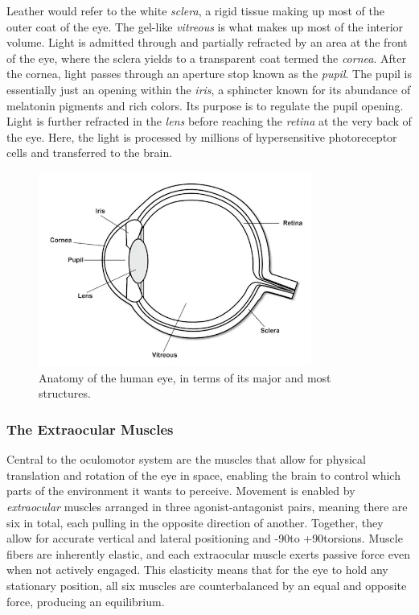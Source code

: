 Leather would refer to the white \textit{sclera}, a rigid tissue making up most of the outer coat of the eye. The gel-like \textit{vitreous} is what makes up most of the interior volume. Light is admitted through and partially refracted by an area at the front of the eye, where the sclera yields to a transparent coat termed the \textit{cornea}. After the cornea, light passes through an aperture stop known as the \textit{pupil}. The pupil is essentially just an opening within the \textit{iris}, a sphincter known for its abundance of melatonin pigments and rich colors. Its purpose is to regulate the pupil opening. Light is further refracted in the \textit{lens} before reaching the \textit{retina} at the very back of the eye. Here, the light is processed by millions of hypersensitive photoreceptor cells and transferred to the brain. 

\begin{figure}[h]
    \centering
    \includegraphics[width=0.8\textwidth]{Images/bt_eye.png}
    \caption{Anatomy of the human eye, in terms of its major and most structures.}
    \label{fig:bt_eye}
\end{figure}

\subsubsection{The Extraocular Muscles}

Central to the oculomotor system are the muscles that allow for physical translation and rotation of the eye in space, enabling the brain to control which parts of the environment it wants to perceive. Movement is enabled by \textit{extraocular} muscles arranged in three agonist-antagonist pairs, meaning there are six in total, each pulling in the opposite direction of another. Together, they allow for accurate vertical and lateral positioning and -90\degree to +90\degree torsions. Muscle fibers are inherently elastic, and each extraocular muscle exerts passive force even when not actively engaged. This elasticity means that for the eye to hold any stationary position, all six muscles are counterbalanced by an equal and opposite force, producing an equilibrium.

